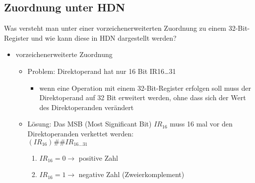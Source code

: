 \subsection{Zuordnung unter HDN}
Was versteht man unter einer vorzeichenerweiterten Zuordnung zu einem 32-Bit-Register und wie kann diese in HDN dargestellt werden?
\begin{itemize}
	\item vorzeichenerweiterte Zuordnung
	\begin{itemize}
		\item Problem: Direktoperand hat nur 16 Bit IR16\ldots 31
		\begin{itemize}
			\item wenn eine Operation mit einem 32-Bit-Register erfolgen soll muss der Direktoperand auf 32 Bit erweitert werden, ohne dass sich der Wert des Direktoperanden verändert
		\end{itemize}
		\item Lösung: Das MSB (Most Significant Bit) $IR_16$ muss 16 mal vor den Direktoperanden verkettet werden:\\
		$(IR_{16})^{} \#\# IR_{16 \ldots 31}$
		\begin{enumerate}
			\item $IR_{16} = 0 \to $ positive Zahl
			\item $IR_{16} = 1 \to $ negative Zahl (Zweierkomplement)
		\end{enumerate}
	\end{itemize}
\end{itemize}
